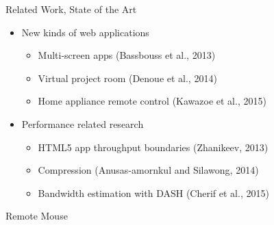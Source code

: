 \documentclass[first=dgreen,second=purple,logo=blueque,finnish]{aaltoslides}
\begin{document}
\begin{frame}{Related Work, State of the Art}

\begin{itemize}
\item New kinds of web applications
\begin{itemize}
\item Multi-screen apps (Bassbouss et al., 2013)
\item Virtual project room (Denoue et al., 2014)
\item Home appliance remote control (Kawazoe et al., 2015)
\end{itemize}
\item Performance related research
\begin{itemize}
\item HTML5 app throughput boundaries (Zhanikeev, 2013)
\item Compression (Anusas-amornkul and Silawong, 2014)
\item Bandwidth estimation with DASH (Cherif et al., 2015)
\end{itemize}
\end{itemize}

\end{frame}


\begin{frame}{Remote Mouse}

\end{frame}

\end{document}
